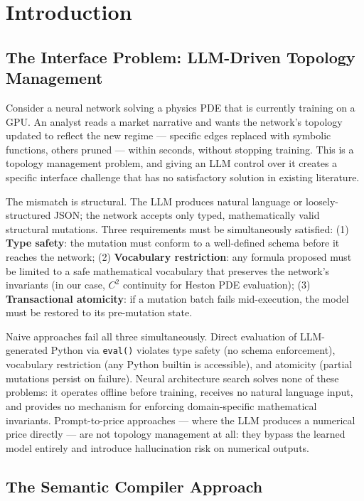 \documentclass[11pt,a4paper]{article}
\begin{document}
\section{Introduction}
\label{sec:intro}

\subsection{The Interface Problem: LLM-Driven Topology Management}

Consider a neural network solving a physics PDE that is currently training on a GPU.
An analyst reads a market narrative and wants the network's topology updated to reflect
the new regime --- specific edges replaced with symbolic functions, others pruned ---
within seconds, without stopping training. This is a topology management problem, and
giving an LLM control over it creates a specific interface challenge that has no
satisfactory solution in existing literature.

The mismatch is structural. The LLM produces natural language or loosely-structured
JSON; the network accepts only typed, mathematically valid structural mutations. Three
requirements must be simultaneously satisfied: (1) \textbf{Type safety}: the mutation
must conform to a well-defined schema before it reaches the network; (2)
\textbf{Vocabulary restriction}: any formula proposed must be limited to a safe
mathematical vocabulary that preserves the network's invariants (in our case, $C^2$
continuity for Heston PDE evaluation); (3) \textbf{Transactional atomicity}: if a
mutation batch fails mid-execution, the model must be restored to its pre-mutation
state.

Naive approaches fail all three simultaneously. Direct evaluation of LLM-generated
Python via \texttt{eval()} violates type safety (no schema enforcement), vocabulary
restriction (any Python builtin is accessible), and atomicity (partial mutations
persist on failure). Neural architecture search \citep{elsken2019neural} solves none
of these problems: it operates offline before training, receives no natural language
input, and provides no mechanism for enforcing domain-specific mathematical invariants.
Prompt-to-price approaches --- where the LLM produces a numerical price directly ---
are not topology management at all: they bypass the learned model entirely and
introduce hallucination risk on numerical outputs.

\subsection{The Semantic Compiler Approach}
\end{document}
